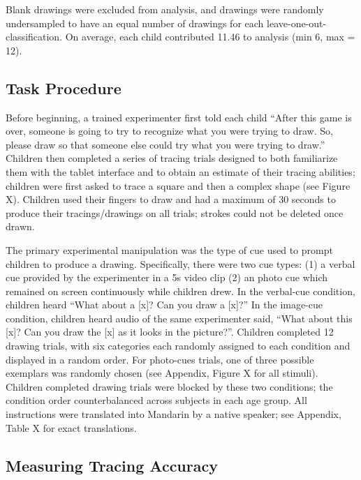 \documentclass[
  english,
  man]{apa6}
\begin{document}
Blank drawings were excluded from analysis, and drawings were randomly undersampled to have an equal number of drawings for each leave-one-out-classification. On average, each child contributed 11.46 to analysis (min 6, max = 12).

\hypertarget{task-procedure}{%
\subsection{Task Procedure}\label{task-procedure}}

Before beginning, a trained experimenter first told each child \enquote{After this game is over, someone is going to try to recognize what you were trying to draw. So, please draw so that someone else could try what you were trying to draw.} Children then completed a series of tracing trials designed to both familiarize them with the tablet interface and to obtain an estimate of their tracing abilities; children were first asked to trace a square and then a complex shape (see Figure X). Children used their fingers to draw and had a maximum of 30 seconds to produce their tracings/drawings on all trials; strokes could not be deleted once drawn.

The primary experimental manipulation was the type of cue used to prompt children to produce a drawing. Specifically, there were two cue types: (1) a verbal cue provided by the experimenter in a 5s video clip (2) an photo cue which remained on screen continuously while children drew. In the verbal-cue condition, children heard \enquote{What about a {[}x{]}? Can you draw a {[}x{]}?} In the image-cue condition, children heard audio of the same experimenter said, \enquote{What about this {[}x{]}? Can you draw the {[}x{]} as it looks in the picture?}. Children completed 12 drawing trials, with six categories each randomly assigned to each condition and displayed in a random order. For photo-cues trials, one of three possible exemplars was randomly chosen (see Appendix, Figure X for all stimuli). Children completed drawing trials were blocked by these two conditions; the condition order counterbalanced across subjects in each age group. All instructions were translated into Mandarin by a native speaker; see Appendix, Table X for exact translations.

\hypertarget{measuring-tracing-accuracy}{%
\subsection{Measuring Tracing Accuracy}\label{measuring-tracing-accuracy}}
\end{document}
